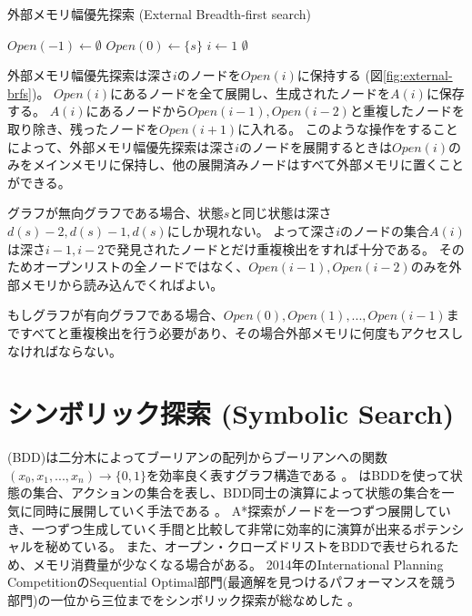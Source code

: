 \begin{algorithm}
\caption{外部メモリ幅優先探索 (External Breadth-first search)}
\label{alg:external-brfs}
	$Open(-1) \leftarrow \emptyset$\;
	$Open(0) \leftarrow \{s\}$\;
	$i \leftarrow 1$\;
	\Return $\emptyset$\;
\end{algorithm}

外部メモリ幅優先探索は深さ$i$のノードを$Open(i)$に保持する (図\ref{fig:external-brfs})。
$Open(i)$にあるノードを全て展開し、生成されたノードを$A(i)$に保存する。
$A(i)$にあるノードから$Open(i-1), Open(i-2)$と重複したノードを取り除き、残ったノードを$Open(i+1)$に入れる。
このような操作をすることによって、外部メモリ幅優先探索は深さ$i$のノードを展開するときは$Open(i)$のみをメインメモリに保持し、他の展開済みノードはすべて外部メモリに置くことができる。

グラフが無向グラフである場合、状態$s$と同じ状態は深さ$d(s)-2, d(s)-1, d(s)$にしか現れない。
よって深さ$i$のノードの集合$A(i)$は深さ$i-1, i-2$で発見されたノードとだけ重複検出をすれば十分である。
そのためオープンリストの全ノードではなく、$Open(i-1), Open(i-2)$のみを外部メモリから読み込んでくればよい。

もしグラフが有向グラフである場合、$Open(0), Open(1), ..., Open(i-1)$まですべてと重複検出を行う必要があり、その場合外部メモリに何度もアクセスしなければならない。


\section{シンボリック探索 (Symbolic Search)}
\label{sec:symbolic-search}
 (BDD)は二分木によってブーリアンの配列からブーリアンへの関数$(x_0,x_1,...,x_n) \rightarrow \{0, 1\}$を効率良く表すグラフ構造である \cite{akers1978binary,bryant1992symbolic}。
はBDDを使って状態の集合、アクションの集合を表し、BDD同士の演算によって状態の集合を一気に同時に展開していく手法である \cite{edelkamp1998obdds,Edelkamp99deterministicstate}。
A*探索がノードを一つずつ展開していき、一つずつ生成していく手間と比較して非常に効率的に演算が出来るポテンシャルを秘めている。
また、オープン・クローズドリストをBDDで表せられるため、メモリ消費量が少なくなる場合がある。
2014年のInternational Planning CompetitionのSequential Optimal部門(最適解を見つけるパフォーマンスを競う部門)の一位から三位までをシンボリック探索が総なめした \cite{vallati20152014}。


